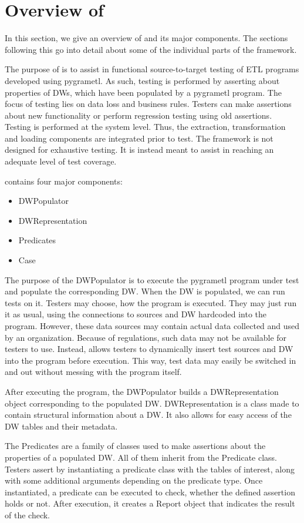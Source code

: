 \section{Overview of \FW{}}\label{sect:Overview}
In this section, we give an overview of \FW{} and its major components. The sections following this go into detail about some of the individual parts of the framework.

The purpose of \FW{} is to assist in functional source-to-target testing of ETL programs developed using pygrametl. As such, testing is performed by asserting about properties of DWs, which have been populated by a pygrametl program. The focus of testing lies on data loss and business rules. Testers can make assertions about new functionality or perform regression testing using old assertions. Testing is performed at the system level. Thus, the extraction, transformation and loading components are integrated prior to test. The framework is not designed for exhaustive testing. It is instead meant to assist in reaching an adequate level of test coverage.

\FW{} contains four major components:
\begin{itemize}
\item DWPopulator
\item DWRepresentation
\item Predicates
\item Case 
\end{itemize}

The purpose of the DWPopulator is to execute the pygrametl program under test and populate the corresponding DW. When the DW is populated, we can run tests on it.  Testers may choose, how the program is executed. They may just run it as usual, using the connections to sources and DW hardcoded into the program. However, these data sources may contain actual data collected and used by an organization. Because of regulations, such data may not be available for testers to use. Instead, \FW{} allows testers to dynamically insert test sources and DW into the program before execution. This way, test data may easily be switched in and out without messing with the program itself.  

After executing the program, the DWPopulator builds a DWRepresentation object corresponding to the populated DW. DWRepresentation is a class made to contain structural information about a DW. It also allows for easy access of the DW tables and their metadata.

The Predicates are a family of classes used to make assertions about the properties of a populated DW. All of them inherit from the Predicate class. Testers assert by instantiating a predicate class with the tables of interest, along with some additional arguments depending on the predicate type. Once instantiated, a predicate can be executed to check, whether the defined assertion holds or not. After execution, it creates a Report object that indicates the result of the check.

